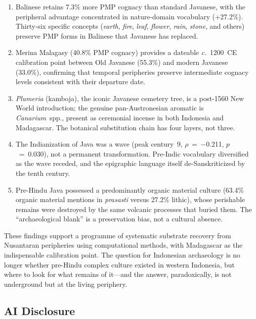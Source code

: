 \documentclass[12pt,a4paper]{article}
\begin{document}
\begin{enumerate}
\item Balinese retains 7.3\% more PMP cognacy than standard Javanese, with the peripheral advantage concentrated in nature-domain vocabulary (+27.2\%). Thirty-six specific concepts (\emph{earth}, \emph{fire}, \emph{leaf}, \emph{flower}, \emph{rain}, \emph{stone}, and others) preserve PMP forms in Balinese that Javanese has replaced.

\item Merina Malagasy (40.8\% PMP cognacy) provides a dateable \textit{c.}~1200~CE calibration point between Old Javanese (55.3\%) and modern Javanese (33.0\%), confirming that temporal peripheries preserve intermediate cognacy levels consistent with their departure date.

\item \emph{Plumeria} (kamboja), the iconic Javanese cemetery tree, is a post-1560 New World introduction; the genuine pan-Austronesian aromatic is \emph{Canarium}~spp., present as ceremonial incense in both Indonesia and Madagascar. The botanical substitution chain has four layers, not three.

\item The Indianization of Java was a wave (peak century~9, $\rho$~=~$-$0.211, $p$~=~0.030), not a permanent transformation. Pre-Indic vocabulary diversified as the wave receded, and the epigraphic language itself de-Sanskriticized by the tenth century.

\item Pre-Hindu Java possessed a predominantly organic material culture (63.4\% organic material mentions in \emph{prasasti} versus 27.2\% lithic), whose perishable remains were destroyed by the same volcanic processes that buried them. The ``archaeological blank'' is a preservation bias, not a cultural absence.
\end{enumerate}

These findings support a programme of systematic substrate recovery from Nusantaran peripheries using computational methods, with Madagascar as the indispensable calibration point. The question for Indonesian archaeology is no longer whether pre-Hindu complex culture existed in western Indonesia, but where to look for what remains of it---and the answer, paradoxically, is not underground but at the living periphery.

\subsection*{AI Disclosure}
\end{document}
